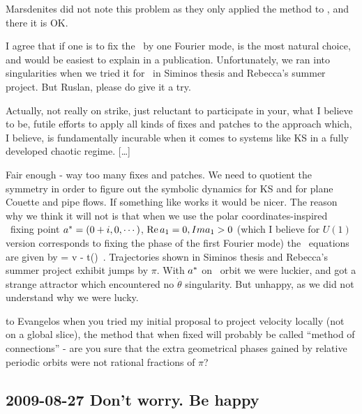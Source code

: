 Marsdenites did not note this problem as they only applied
the method to \reqva, and there it is OK.

I agree that if one is to fix the \slice\ by one Fourier
mode,  is the most natural choice, and would be
easiest to explain in a publication. Unfortunately, we ran
into singularities when we tried it for \CLe\ in Siminos
thesis and
     {Rebecca's summer project}.
But Ruslan, please do give it a try.

\medskip{}
Actually, not really on strike, just reluctant to participate
in your, what I believe to be, futile efforts to apply all
kinds of fixes and patches to the approach which, I believe,
is fundamentally incurable when it comes to systems like KS
in a fully developed chaotic regime. [\dots]

\medskip{} Fair enough - way too many fixes and
patches. We need to quotient the symmetry in order to figure
out the symbolic dynamics for KS and for plane Couette and
pipe flows. If something like  works it would
be nicer. The reason why we think it will not is that when we
use the polar coordinates-inspired \slice\ fixing point
$a^{*}=(0+i,0, \cdots)$, ${\rm Re}\,a_1=0,\;\\Ima_1>0$
(which I believe for $U(1)$ version corresponds to fixing the
phase of the first Fourier mode) the \reducedsp\ equations
are given by
\beq
\dot{\ssp} = v -  t(\ssp)
\,.
Trajectories shown in %
Siminos thesis and
     {Rebecca's summer project}
exhibit jumps by $\pi$. With $a^{*}$ on \reqv\ orbit we
were luckier, and got a strange attractor which encountered
no $\dot{\theta}$ singularity. But unhappy, as we did not
understand why we were lucky.

\medskip{} to Evangelos when you tried my initial
proposal to project velocity locally (not on a global slice),
the method that when fixed will probably be called ``method
of connections'' - are you sure that the extra geometrical
phases gained by relative periodic orbits were not rational
fractions of $\pi$?

\subsection{2009-08-27 Don't worry. Be happy}

